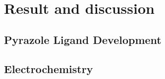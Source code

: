 \documentclass[../Master.tex]{subfiles}
\begin{document}
\chapter{Result and discussion}

\section{Pyrazole Ligand Development}\label{sec:pyr-dev}

\section{Electrochemistry}\label{sec:electrochemistry}
\end{document}
